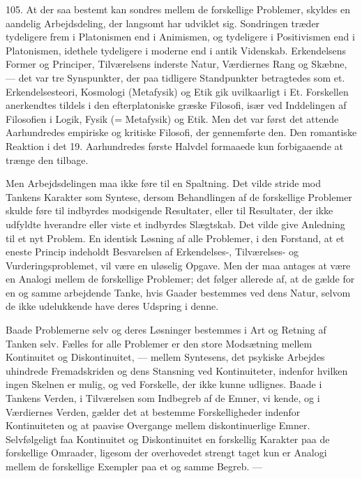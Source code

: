 \documentclass[12pt,a4paper]{book}
\newcommand{\apage}[1]{\marginnote{\footnotesize\textit{[#1]}}}
\begin{document}
105. At der saa bestemt kan sondres mellem de forskellige Problemer, skyldes en
aandelig Arbejdsdeling, der langsomt har udviklet sig. Sondringen træder
tydeligere frem i Platonismen end i Animismen, og tydeligere i Positivismen end i
Platonismen, idethele tydeligere i moderne end i antik Videnskab. Erkendelsens
Former og Principer, Tilværelsens inderste Natur, Værdiernes Rang og Skæbne, ---
det var tre Synspunkter, der paa tidligere Standpunkter betragtedes som et.
Erkendelsesteori, Kosmologi (Metafysik) og Etik gik uvilkaarligt i Et. Forskellen
anerkendtes tildels i den efterplatoniske græske Filosofi, især ved Inddelingen af
Filosofien i Logik, Fysik (= Metafysik) og Etik. Men det var først det attende
Aarhundredes empiriske og kritiske Filosofi, der gennemførte den. Den romantiske
Reaktion i det 19. Aarhundredes første Halvdel formaaede kun forbigaaende at
trænge den tilbage.

Men Arbejdsdelingen maa ikke føre til en Spaltning. Det vilde stride mod Tankens
Karakter som Syntese, dersom Behandlingen af de forskellige Problemer skulde føre
til indbyrdes modsigende Resultater, eller til Resultater, der ikke udfyldte
hverandre eller viste et indbyrdes Slægtskab. Det vilde give Anledning til et nyt
Problem. En identisk Løsning af alle Problemer, i den Forstand, at et eneste
Princip indeholdt Besvarelsen af Erkendelses-, Tilværelses- og Vurderingsproblemet,
vil være en uløselig Opgave. Men der maa antages at være en Analogi mellem de
forskellige Problemer; det følger allerede af, at de gælde for en og samme
arbejdende Tanke, hvis Gaader bestemmes ved dens Natur, selvom de ikke udelukkende
have deres Udspring i denne.

\apage{252} Baade Problemerne selv og deres Løsninger bestemmes i Art og Retning af Tanken
selv. Fælles for alle Problemer er den store Modsætning mellem Kontinuitet og
Diskontinuitet, --- mellem Syntesens, det psykiske Arbejdes uhindrede Fremadskriden
og dens Stansning ved Kontinuiteter, indenfor hvilken ingen Skelnen er mulig, og
ved Forskelle, der ikke kunne udlignes. Baade i Tankens Verden, i Tilværelsen som
Indbegreb af de Emner, vi kende, og i Værdiernes Verden, gælder det at bestemme
Forskelligheder indenfor Kontinuiteten og at paavise Overgange mellem
diskontinuerlige Emner. Selvfølgeligt faa Kontinuitet og Diskontinuitet en
forskellig Karakter paa de forskellige Omraader, ligesom der overhovedet strengt
taget kun er Analogi mellem de forskellige Exempler paa et og samme Begreb. ---
\end{document}
